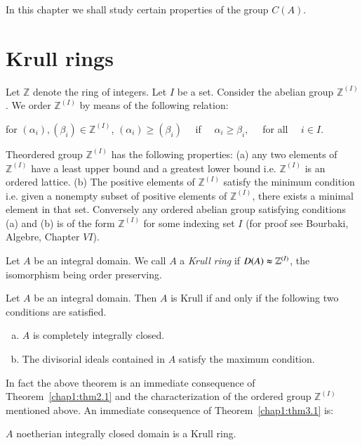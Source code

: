 In this chapter we shall study certain properties of the group
$C(A)$. 

\section{Krull rings}\label{chap1:sec3}%
Let $\mathbb{Z}$ denote the ring of integers. Let $I$ be a
set. Consider the  abelian group $\mathbb{Z}^{(I)}$. We order
$\mathbb{Z}^{(I)}$ by means of the following relation:  
  
\noindent
  for $(\alpha_i),(\beta_i) \in \mathbb{Z}^{(I)}$, $( \alpha_i) \ge
  (\beta_i) $ ~~if~~ $\alpha_i \ge \beta_i, $ ~~for all~~ $i \in I$. 
  
The\pageoriginale ordered group $\mathbb{Z}^{(I)}$ has the following
properties: 
(a) any two elements of $\mathbb{Z}^{(I)}$ have a least upper bound
and a greatest lower bound i.e. $\mathbb{Z}^{(I)}$ is an ordered
lattice. (b) The positive elements of $\mathbb{Z}^{(I)}$ satisfy the
minimum condition i.e. given a nonempty subset of  positive elements
of $\mathbb{Z}^{(I)}$, there exists a minimal element in that
set. Conversely any ordered abelian group satisfying conditions (a)
and (b) is of the form $\mathbb{Z}^{(I)}$ for some indexing set $I$
(for proof see Bourbaki, Algebre, Chapter $VI$).  
  
Let $A$ be an integral domain. We call $A$ a \textit{Krull ring} if
$D(A) \thickapprox \mathbb{Z}^{(I)}$, the isomorphism being order
preserving. 

\begin{theorem}\label{chap1:thm3.1} %
Let $A$ be an integral domain. Then $A$ is Krull if and only if
  the following two conditions are satisfied. 
\begin{enumerate}[(a)]
\item $A$ is completely integrally closed.

\item The divisorial ideals contained in $A$ satisfy the maximum
  condition. 
\end{enumerate} 
  \end{theorem}  
  
\noindent
In fact the above theorem is an immediate consequence of 
Theorem~\ref{chap1:thm2.1} and the characterization of the ordered group
  $\mathbb{Z}^{(I)}$ mentioned above. An immediate consequence of
  Theorem~\ref{chap1:thm3.1} is: 
  
\begin{theorem}\label{chap1:thm3.2} %
$A$ noetherian integrally closed domain is a Krull ring. 
\end{theorem} 
  
